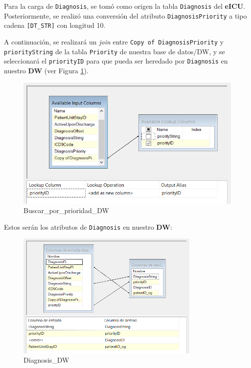 \documentclass[12pt, a4paper, twoside]{article}
\begin{document}
	Para la carga de \texttt{Diagnosis}, se tomó como origen la tabla \texttt{Diagnosis} del \textbf{eICU}. Posteriormente, se realizó una conversión del atributo \texttt{DiagnosisPriority} a tipo cadena \texttt{[DT\_STR]} con longitud 10.
	
	A continuación, se realizará un \textit{join} entre \texttt{Copy of DiagnosisPriority} y \texttt{priorityString} de la tabla \texttt{Priority} de nuestra base de datos/DW, y se seleccionará el \texttt{priorityID} para que pueda ser heredado por \texttt{Diagnosis} en nuestro \textbf{DW} (ver Figura \ref{fig:29}).
	
	\begin{figure}[H]
		\centering
		\includegraphics[width=1\textwidth]{image/112_carga_diagnosis_lookup.png}
		\caption{Buscar\_por\_prioridad\_DW}
		\label{fig:29}
	\end{figure}
	
	Estos serán los atributos de \texttt{Diagnosis} en nuestro \textbf{DW}:
	
	\begin{figure}[H]
		\centering
		\includegraphics[width=0.8\textwidth]{image/112_carga_diagnosis_destino.png}
		\caption{Diagnosis\_DW}
		\label{fig:30}
	\end{figure}
	
\end{document}
